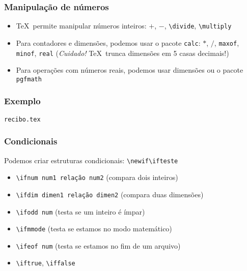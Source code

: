 \documentclass{beamer}
\newcommand{\code}[1]{\texttt{#1}}
\begin{document}
\begin{frame}
  \frametitle{Manipulação de números}
   \begin{itemize}
      \item \TeX\ permite manipular números inteiros: $+$, $-$, \code{\textbackslash divide}, \code{\textbackslash multiply}
      \item Para contadores e dimensões, podemos usar o pacote \code{calc}: $*$, $/$, \code{maxof}, \code{minof}, \code{real} (\emph{Cuidado!} \TeX\ trunca dimensões em 5 casas decimais!)
      \item Para operações com números reais, podemos usar dimensões ou o pacote \code{pgfmath}
   \end{itemize}
\end{frame}
\begin{frame}
   \frametitle{Exemplo}
   \begin{center}
      \begin{block}{}
         \begin{center}
            \code{recibo.tex}
         \end{center}
      \end{block}
   \end{center}
\end{frame}
\begin{frame}
   \frametitle{Condicionais}
   Podemos criar estruturas condicionais: \code{\textbackslash newif\textbackslash ifteste}
   \begin{itemize}
      \item \code{\textbackslash ifnum num1 relação num2} (compara dois inteiros)
      \item \code{\textbackslash ifdim dimen1 relação dimen2} (compara duas dimensões)
      \item \code{\textbackslash ifodd num} (testa se um inteiro é ímpar)
      \item \code{\textbackslash ifmmode} (testa se estamos no modo matemático)
      \item \code{\textbackslash ifeof num} (testa se estamos no fim de um arquivo)
      \item \code{\textbackslash iftrue}, \code{\textbackslash iffalse}
   \end{itemize}
\end{frame}
\end{document}

